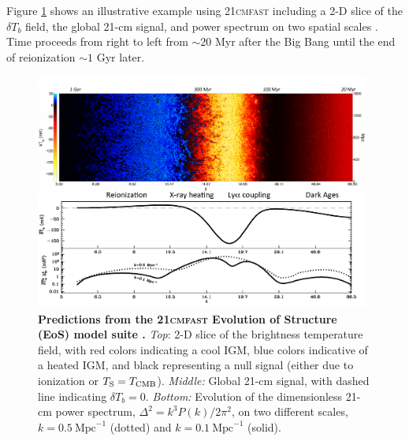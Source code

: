 Figure \ref{fig:eosFG} shows an illustrative example using \textsc{21cmfast} \cite{Mesinger2011} including a 2-D slice of the $\delta T_b$ field, the global 21-cm signal, and power spectrum on two spatial scales \cite{Mesinger2016}. Time proceeds from right to left from $\sim 20$ Myr after the Big Bang until the end of reionization $\sim 1$ Gyr later.

\begin{figure}[]
\begin{center}
\includegraphics[width=0.98\textwidth]{Mirocha/eosFG.pdf}
\end{center}
\caption{{\bf Predictions from the \textsc{21cmfast} Evolution of Structure (EoS) model suite \cite{Mesinger2016}.} \textit{Top}: 2-D slice of the brightness temperature field, with red colors indicating a cool IGM, blue colors indicative of a heated IGM, and black representing a null signal (either due to ionization or $T_{\text{S}}=T_{\text{CMB}}$). \textit{Middle:} Global 21-cm signal, with dashed line indicating  $\delta T_b = 0$. \textit{Bottom:} Evolution of the dimensionless 21-cm power spectrum, $\Delta^2 = k^3 P(k) / 2\pi^2$, on two different scales, $k=0.5 \ \mathrm{Mpc}^{-1}$ (dotted) and $k=0.1 \ \mathrm{Mpc}^{-1}$ (solid).}
\label{fig:eosFG}
\end{figure}

